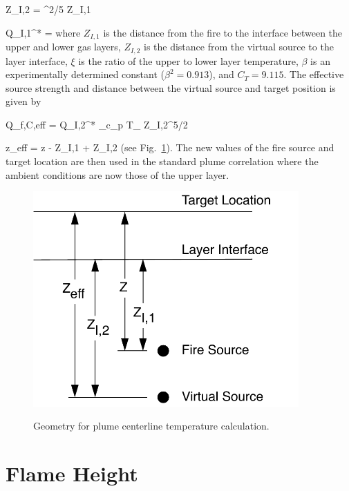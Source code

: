 \be Z_{I,2} = ^{2/5} Z_{I,1}  \ee

\be Q_{I,1}^* =   \ee
where $Z_{I,1}$ is the distance from the fire to the interface between the upper and lower gas layers, $Z_{I,2}$ is the distance from the virtual source to the layer interface, $\xi$ is the ratio of the upper to lower layer temperature, $\beta$ is an experimentally determined constant \cite{Zukoski:1981} ($\beta^2 = 0.913$), and $C_T = 9.115$.  The effective source strength and distance between the virtual source and target position is given by

\be Q_{f,C,eff} = Q_{I,2}^* \rho_\infty c_{p\infty} T_\infty {} Z_{I,2}^{5/2}  \ee

\be z_{eff} = z - Z_{I,1} + Z_{I,2} \ee
(see Fig.~\ref{fig:Plume_Temp_Notation}). The new values of the fire source and  target location are then used in the standard plume correlation where the ambient conditions are now those of the upper layer.
\begin{figure}
\begin{center}
\includegraphics[width=4.0in]{FIGURES/Theory/Plume_Temp_Notation}\\
\end{center}
\caption{Geometry for plume centerline temperature calculation.}
 \label{fig:Plume_Temp_Notation}
\end{figure}

\section{Flame Height}
\label{sec:firemassbalance}


